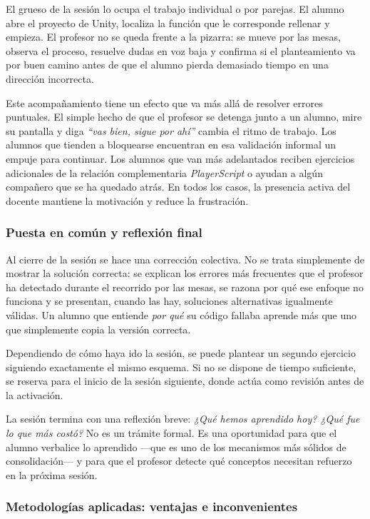 \documentclass[a4paper,12pt]{article}
\begin{document}
El grueso de la sesión lo ocupa el trabajo individual o por parejas. El alumno
abre el proyecto de Unity, localiza la función que le corresponde rellenar y
empieza. El profesor no se queda frente a la pizarra: se mueve por las mesas,
observa el proceso, resuelve dudas en voz baja y confirma si el planteamiento
va por buen camino antes de que el alumno pierda demasiado tiempo en una dirección
incorrecta.

Este acompañamiento tiene un efecto que va más allá de resolver errores
puntuales. El simple hecho de que el profesor se detenga junto a un alumno, mire
su pantalla y diga \textit{``vas bien, sigue por ahí''} cambia el ritmo de trabajo.
Los alumnos que tienden a bloquearse encuentran en esa validación informal un
empuje para continuar. Los alumnos que van más adelantados reciben ejercicios adicionales de la relación complementaria
\textit{PlayerScript} o ayudan a algún compañero que se ha quedado atrás.
En todos los casos, la presencia activa del docente mantiene la motivación y reduce la frustración.

\subsubsection*{Puesta en común y reflexión final}

Al cierre de la sesión se hace una corrección colectiva. No se trata simplemente
de mostrar la solución correcta: se explican los errores más frecuentes que el
profesor ha detectado durante el recorrido por las mesas, se razona por qué ese
enfoque no funciona y se presentan, cuando las hay, soluciones alternativas
igualmente válidas. Un alumno que entiende \textit{por qué} su código fallaba
aprende más que uno que simplemente copia la versión correcta.

Dependiendo de cómo haya ido la sesión, se puede plantear un segundo ejercicio
siguiendo exactamente el mismo esquema. Si no se dispone de tiempo suficiente, se reserva para el
inicio de la sesión siguiente, donde actúa como revisión antes de la activación.

La sesión termina con una reflexión breve: \textit{¿Qué hemos aprendido hoy?
¿Qué fue lo que más costó?} No es un trámite formal. Es una oportunidad para
que el alumno verbalice lo aprendido ---que es uno de los mecanismos más sólidos
de consolidación--- y para que el profesor detecte qué conceptos necesitan
refuerzo en la próxima sesión.

\subsubsection*{Metodologías aplicadas: ventajas e inconvenientes}
\end{document}
